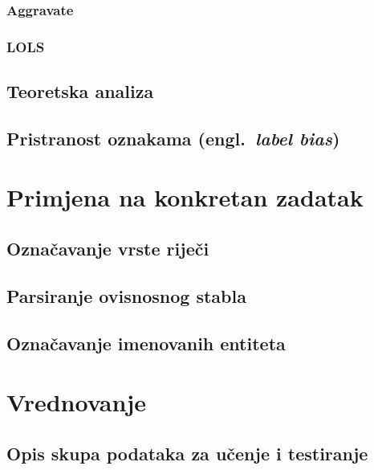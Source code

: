 \documentclass[times, utf8, diplomski]{fer}
\begin{document}
\subsection{Aggravate}

\subsection{LOLS}


\section{Teoretska analiza}
\section{Pristranost oznakama (engl.~\emph{label bias})}\label{ch:labelbias}


\chapter{Primjena na konkretan zadatak}

\section{Označavanje vrste riječi}


\section{Parsiranje ovisnosnog stabla}


\section{Označavanje imenovanih entiteta}

\chapter{Vrednovanje}

\section{Opis skupa podataka za učenje i testiranje}

\end{document}
